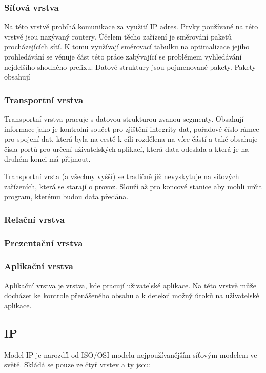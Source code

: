 \subsubsection{Síťová vrstva}
Na této vrstvě probíhá komunikace za využití IP adres. Prvky používané na této vrstvě jsou nazývaný routery.
Účelem těcho zařízení je směrování paketů procházejících sítí. K tomu využívají směrovací tabulku na optimalizace jejího prohledávání
se věnuje část této práce zabývající se problémem vyhledávání nejdelšího shodného prefixu.
Datové struktury jsou pojmenované pakety.
Pakety obsahují

\subsubsection{Transportní vrstva}
Transportní vrstva pracuje s datovou strukturou zvanou segmenty. Obsahují informace jako je kontrolní součet pro zjištění integrity dat,
pořadové číslo rámce pro spojení dat, která byla na cestě k cíli rozdělena na více částí a také obsahuje čísla portů
pro určení uživatelských aplikací, která data odeslala a která je na druhém konci má přijmout.

Transportní vrsta (a všechny vyšší) se tradičně již nevyskytuje na síťových zařízeních, která se starají o provoz.
Slouží až pro koncové stanice aby mohli určit program, kterému budou data předána.

\subsubsection{Relační vrstva}


\subsubsection{Prezentační vrstva}


\subsubsection{Aplikační vrstva}
Aplikační vrstva je vrstva, kde pracují uživatelské aplikace.
Na této vrstvě může docházet ke kontrole přenášeného obsahu a k detekci možný útoků na uživatelské aplikace.

\subsection{IP}
Model IP je narozdíl od ISO/OSI modelu nejpoužívanějším síťovým modelem ve světě.
Skládá se pouze ze čtyř vrstev a ty jsou:


